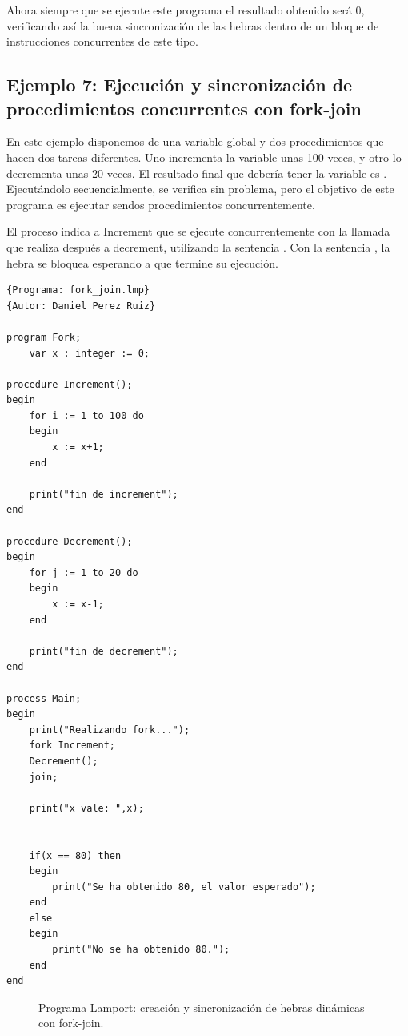 Ahora siempre que se ejecute este programa el resultado obtenido será 0, verificando así la buena sincronización de las hebras dentro de un bloque de instrucciones concurrentes de este tipo.

\newpage
\subsection{Ejemplo 7: Ejecución y sincronización de procedimientos concurrentes con fork-join}
En este ejemplo disponemos de una variable global  y dos procedimientos que hacen dos tareas diferentes. Uno incrementa la variable  unas 100 veces, y otro lo decrementa unas 20 veces. El resultado final que debería tener la variable es . Ejecutándolo secuencialmente, se verifica sin problema, pero el objetivo de este programa es ejecutar sendos procedimientos concurrentemente. 

\vspace{0.5cm}

El proceso  indica a Increment que se ejecute concurrentemente con la llamada que realiza después a decrement, utilizando la sentencia . Con la sentencia , la hebra  se bloquea esperando a que  termine su ejecución.
\begin{lstlisting}[style=lamportStyle]
{Programa: fork_join.lmp}
{Autor: Daniel Perez Ruiz}

program Fork;
	var x : integer := 0;

procedure Increment();
begin
	for i := 1 to 100 do
	begin
		x := x+1;
	end
	
	print("fin de increment");
end

procedure Decrement();
begin
	for j := 1 to 20 do
	begin
		x := x-1;
	end
	
	print("fin de decrement");
end

process Main;
begin
	print("Realizando fork...");
	fork Increment;
	Decrement();
	join;
	
	print("x vale: ",x);
	
	
	if(x == 80) then
	begin
		print("Se ha obtenido 80, el valor esperado");
	end
	else
	begin
		print("No se ha obtenido 80.");
	end
end
\end{lstlisting}
\begin{figure}[h]
\caption{Programa Lamport: creación y sincronización de hebras dinámicas con fork-join.}
\label{fig:lamportForkJoin}
\end{figure}

